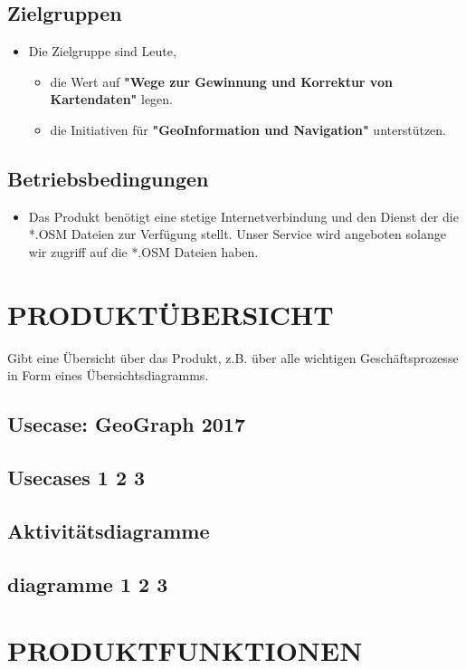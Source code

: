 	\subsection{Zielgruppen}
	\begin{itemize}
		\item Die Zielgruppe sind Leute, 
		\begin{itemize}
			\item die Wert auf \textbf{"Wege zur Gewinnung und Korrektur von Kartendaten"} legen.
			\item die Initiativen für \textbf{"GeoInformation und Navigation"} unterstützen.
		\end{itemize}
	\end{itemize}
	\subsection{Betriebsbedingungen}
	\begin{itemize}
		\item Das Produkt benötigt eine stetige Internetverbindung und den Dienst der die *.OSM Dateien zur Verfügung stellt. Unser Service wird angeboten solange wir zugriff auf die *.OSM Dateien haben.
	\end{itemize}
	
	
	\section{\Large PRODUKTÜBERSICHT}
	Gibt eine Übersicht über das Produkt, z.B. über alle wichtigen Geschäftsprozesse in Form eines Übersichtsdiagramms.
	\subsection{Usecase: GeoGraph 2017}
	\subsection{Usecases 1 2 3}
	\subsection{Aktivitätsdiagramme}
	\subsection{diagramme 1 2 3}


	\section{\Large PRODUKTFUNKTIONEN}
